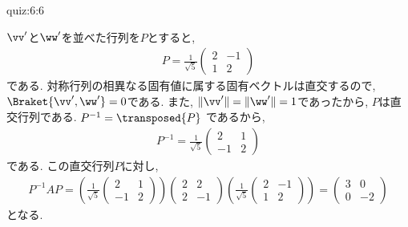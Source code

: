 \begin{answerof}{quiz:6:6}
  
  $\vv'$と$\ww'$を並べた行列を$P$とすると,
  \begin{align*}
    P=\frac{1}{\sqrt{5}}
    \begin{pmatrix}
      2&-1\\
      1&2
    \end{pmatrix}
  \end{align*}
  である.  対称行列の相異なる固有値に属する固有ベクトルは直交するので,
  $\Braket{\vv',\ww'}=0$である.
  また, $\|\vv'\|=\|\ww'\|=1$であったから,
  $P$は直交行列である.
  $P^{-1}=\transposed{P}$
  であるから,
  \begin{align*}
    P^{-1}=\frac{1}{\sqrt{5}}
    \begin{pmatrix}
      2&1\\
      -1&2
    \end{pmatrix}
  \end{align*}
  である.
  この直交行列$P$に対し,
  \begin{align*}
    P^{-1}AP=
    (\frac{1}{\sqrt{5}}
    \begin{pmatrix}
      2&1\\
      -1&2
    \end{pmatrix})
    \begin{pmatrix}
      2&2\\2&-1
    \end{pmatrix}
    (\frac{1}{\sqrt{5}}
    \begin{pmatrix}
      2&-1\\
      1&2
    \end{pmatrix})
    =
    \begin{pmatrix}
      3&0\\0&-2
    \end{pmatrix}
  \end{align*}
  となる.
  
\end{answerof}






